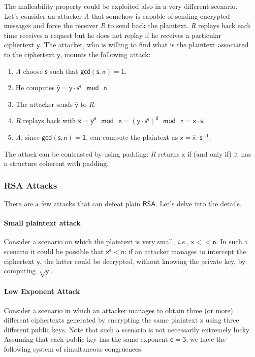 \documentclass{article}
\begin{document}
\par \noindent The malleability property could be exploited also in a very different scenario. Let's consider an attacker \textit{A} that somehow is capable of sending encrypted messages and force the receiver \textit{R} to send back the plaintext. \textit{R} replays back each time receives a request but he does not replay if he receives a particular ciphertext $\mathsf{y}$. The attacker, who is willing to find what is the plaintext associated to the ciphertext $\mathsf{y}$, mounts the following attack:

\begin{enumerate}
    \item \textit{A} choose $\mathsf{s}$ such that $\mathsf{gcd(s, n) = 1}$.
    \item He computes $\mathsf{\hat{y} = y \cdot s^{e} \text{ } mod \text{ } n}$.
    \item The attacker sends $\mathsf{\hat{y}}$ to \textit{R}.
    \item \textit{R} replays back with $\mathsf{\hat{x} = \hat{y}^d \text{ } mod \text{ } n = (y \cdot s^{e})^d \text{ } mod \text{ } n = x \cdot s}$.
    \item \textit{A}, since $\mathsf{gcd(s, n) = 1}$, can compute the plaintext as $\mathsf{x = \hat{x} \cdot s^{-1}}$.
\end{enumerate}

\par \noindent The attack can be contrasted by using padding: \textit{R} returns $\mathsf{x}$ if (and only if) it has a structure coherent with padding.

\subsubsection{RSA Attacks}
\par There are a few attacks that can defeat plain $\mathsf{RSA}$. Let's delve into the details.

\paragraph{Small plaintext attack} Consider a scenario on which the plaintext is very small, \textit{i.e.}, $\mathsf{x << n}$. In such a scenario it could be possible that $\mathsf{x^e < n}$: if an attacker manages to intercept the ciphertext $\mathsf{y}$, the latter could be decrypted, without knowing the private key, by computing $\mathsf{\sqrt[e]{y}}$.

\paragraph{Low Exponent Attack} Consider a scenario in which an attacker manages to obtain three (or more) different ciphertexts generated by encrypting the same plaintext $\mathsf{x}$ using three different public keys. Note that such a scenario is not necessarily extremely lucky. Assuming that each public key has the same exponent $\mathsf{e = 3}$, we have the following system of simultaneous congruences:
\end{document}
